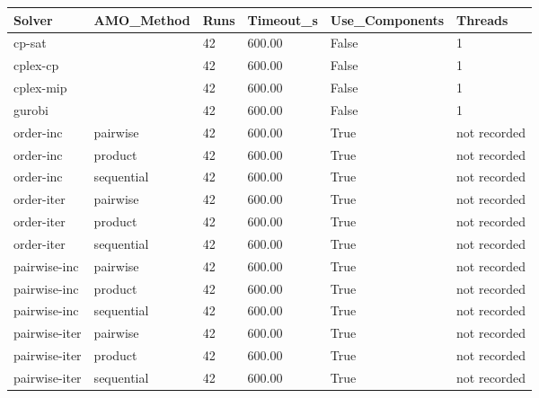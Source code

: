 \begin{tabular}{llllll}
\hline
Solver & AMO\_Method & Runs & Timeout\_s & Use\_Components & Threads \\
\hline
cp-sat &  & 42 & 600.00 & False & 1 \\
cplex-cp &  & 42 & 600.00 & False & 1 \\
cplex-mip &  & 42 & 600.00 & False & 1 \\
gurobi &  & 42 & 600.00 & False & 1 \\
order-inc & pairwise & 42 & 600.00 & True & not recorded \\
order-inc & product & 42 & 600.00 & True & not recorded \\
order-inc & sequential & 42 & 600.00 & True & not recorded \\
order-iter & pairwise & 42 & 600.00 & True & not recorded \\
order-iter & product & 42 & 600.00 & True & not recorded \\
order-iter & sequential & 42 & 600.00 & True & not recorded \\
pairwise-inc & pairwise & 42 & 600.00 & True & not recorded \\
pairwise-inc & product & 42 & 600.00 & True & not recorded \\
pairwise-inc & sequential & 42 & 600.00 & True & not recorded \\
pairwise-iter & pairwise & 42 & 600.00 & True & not recorded \\
pairwise-iter & product & 42 & 600.00 & True & not recorded \\
pairwise-iter & sequential & 42 & 600.00 & True & not recorded \\
\hline
\end{tabular}
